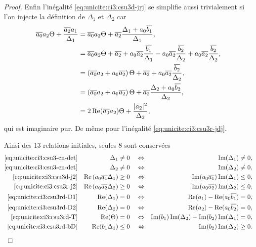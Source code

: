 \begin{proof}
    Enfin l'inégalité \eqref{eq:unicite:ci3:csu3d-jrj} se simplifie aussi trivialement si l'on injecte la définition de \(\Delta_1\) et \(\Delta_2\) car
    \begin{align*}
    {\overline{a_0}}a_2\Theta + \dfrac{{\overline{a_2}}a_1}{\Delta_1} & = {\overline{a_0}}a_2\Theta + {\overline{a_2}}\dfrac{\Delta_1 + a_0{\overline{b_1}}}{\Delta_1},
    \\
    &={\overline{a_0}}a_2\Theta + {\overline{a_2}} + a_0{\overline{a_2}}\dfrac{{\overline{b_1}}}{\Delta_1} - a_0{\overline{a_2}}\dfrac{{\overline{b_2}}}{\Delta_2} + a_0{\overline{a_2}}\dfrac{{\overline{b_2}}}{\Delta_2},
    \\
    &=\left({\overline{a_0}}a_2 + a_0{\overline{a_2}}\right)\Theta + {\overline{a_2}} + a_0{\overline{a_2}}\dfrac{{\overline{b_2}}}{\Delta_2},
    \\
    &=\left({\overline{a_0}}a_2 + a_0{\overline{a_2}}\right)\Theta + {\overline{a_2}}\dfrac{\Delta_2 + a_0{\overline{b_2}}}{\Delta_2},
    \\
    &=2\operatorname{Re}({\overline{a_0}}a_2)\Theta + \dfrac{|a_2|^2}{\Delta_2},
    \end{align*}
    qui est imaginaire pur.
    De même pour l'inégalité \eqref{eq:unicite:ci3:csu3r-jdj}.

    Ainsi des 13 relations initiales, seules 8 sont conservées
    \begin{align*}
      \eqref{eq:unicite:ci3:csu3-cn-det} && \Delta_1 & \not= 0 && \Leftrightarrow & \operatorname{Im}(\Delta_1) &\not = 0,
      \\
      \eqref{eq:unicite:ci3:csu3-cn-det} && \Delta_2 & \not= 0 && \Leftrightarrow & \operatorname{Im}(\Delta_2) &\not = 0,
      \\
      \eqref{eq:unicite:ci3:csu3d-j2} && \operatorname{Re}\left(a_0{\overline{a_1}}\Delta_1\right) &\ge 0 & &\Leftrightarrow & \operatorname{Im}(a_0{\overline{a_1}})\operatorname{Im}(\Delta_1) &\le 0 ,
      \\
      \eqref{eq:unicite:ci3:csu3r-j2} && \operatorname{Re}\left(a_0{\overline{a_2}}\Delta_2\right) &\ge 0 & &\Leftrightarrow & \operatorname{Im}(a_0{\overline{a_2}})\operatorname{Im}(\Delta_2) &\le 0,
      \\
      \eqref{eq:unicite:ci3:csu3rd-D1} && \operatorname{Re}(\Delta_1) &= 0 & &\Leftrightarrow & \operatorname{Re}(a_1) - \operatorname{Re}(a_0{\overline{b_1}}) &= 0,
      \\
      \eqref{eq:unicite:ci3:csu3rd-D2} && \operatorname{Re}(\Delta_2) &= 0 & &\Leftrightarrow & \operatorname{Re}(a_2) - \operatorname{Re}(a_0{\overline{b_2}}) &= 0,
      \\
      \eqref{eq:unicite:ci3:csu3rd-T} && \operatorname{Re}(\Theta) &= 0 & &\Leftrightarrow & \operatorname{Im}(b_1)\operatorname{Im}(\Delta_2) - \operatorname{Im}(b_2)\operatorname{Im}(\Delta_1) &= 0,
      \\
      \eqref{eq:unicite:ci3:csu3rd-bD} && \operatorname{Re}(b_1\Delta_1) &\le 0 & &\Leftrightarrow & \operatorname{Im}(b_2)\operatorname{Im}(\Delta_2) &\ge 0.
    \end{align*}

\end{proof}



